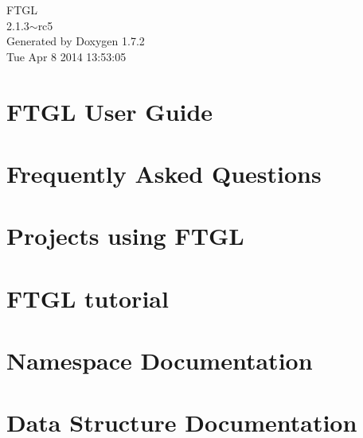 \documentclass[a4paper]{book}
\begin{document}
\begin{titlepage}
\vspace*{7cm}
\begin{center}
{\Large FTGL \\[1ex]\large 2.1.3$\sim$rc5 }\\
\vspace*{1cm}
{\large Generated by Doxygen 1.7.2}\\
\vspace*{0.5cm}
{\small Tue Apr 8 2014 13:53:05}\\
\end{center}
\end{titlepage}
\clearemptydoublepage
{}
\tableofcontents
\clearemptydoublepage
{}
\chapter{FTGL User Guide}
\label{index}
\chapter{Frequently Asked Questions}
\label{ftgl-faq}

\chapter{Projects using FTGL}
\label{ftgl-projects}

\chapter{FTGL tutorial}
\label{ftgl-tutorial}

\chapter{Namespace Documentation}

\chapter{Data Structure Documentation}





















\end{document}
